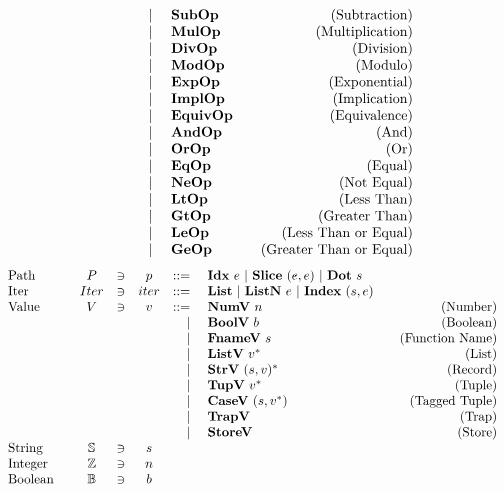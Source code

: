 \begin{align*}
\begin{array}{lcccrlr}
    &&&& | & ~ \textbf{SubOp} &\quad\text{(Subtraction)} \\
    &&&& | & ~ \textbf{MulOp} &\quad\text{(Multiplication)} \\
    &&&& | & ~ \textbf{DivOp} &\quad\text{(Division)} \\
    &&&& | & ~ \textbf{ModOp} &\quad\text{(Modulo)} \\
    &&&& | & ~ \textbf{ExpOp} &\quad\text{(Exponential)} \\
    &&&& | & ~ \textbf{ImplOp} &\quad\text{(Implication)} \\
    &&&& | & ~ \textbf{EquivOp} &\quad\text{(Equivalence)} \\
    &&&& | & ~ \textbf{AndOp} &\quad\text{(And)} \\
    &&&& | & ~ \textbf{OrOp} &\quad\text{(Or)} \\
    &&&& | & ~ \textbf{EqOp} &\quad\text{(Equal)} \\
    &&&& | & ~ \textbf{NeOp} &\quad\text{(Not Equal)} \\
    &&&& | & ~ \textbf{LtOp} &\quad\text{(Less Than)} \\
    &&&& | & ~ \textbf{GtOp} &\quad\text{(Greater Than)} \\
    &&&& | & ~ \textbf{LeOp} &\quad\text{(Less Than or Equal)} \\
    &&&& | & ~ \textbf{GeOp} &\quad\text{(Greater Than or Equal)} \\
\end{array}
\end{align*}
\newpage
\begin{align*}
\begin{array}{lcccrlr}
%
  \text{Path}\quad& P &\ni& p &::=& ~ \idxp ~ e ~ | ~ \slicep ~ (e, e) ~ | ~ \dotp ~ s \\
%
  \text{Iter}\quad& Iter &\ni& iter &::=& ~ \listiter ~ | ~ \listniter ~ e ~|~ \listidxiter ~ (s, e) \\
%
  \text{Value}\quad& V &\ni& v &::=& ~ \numv ~ n &\quad\text{(Number)} \\
    &&&& | & ~ \boolv ~ b &\quad\text{(Boolean)} \\
    &&&& | & ~ \fnamev ~ s &\quad\text{(Function Name)} \\
    &&&& | & ~ \listv ~ \seq v &\quad\text{(List)} \\
    &&&& | & ~ \strv ~ \seq{(s, v)} &\quad\text{(Record)} \\
    &&&& | & ~ \tupv ~ \seq v &\quad\text{(Tuple)} \\
    &&&& | & ~ \casev ~ (s, \seq v) &\quad\text{(Tagged Tuple)} \\
    &&&& | & ~ \trapv &\quad\text{(Trap)} \\
    &&&& | & ~ \storev &\quad\text{(Store)} \\
  \text{String}\quad& \mathbb S &\ni& s \\
  \text{Integer}\quad& \mathbb Z &\ni& n \\
  \text{Boolean}\quad& \mathbb B &\ni& b \\
\end{array}
\end{align*}

